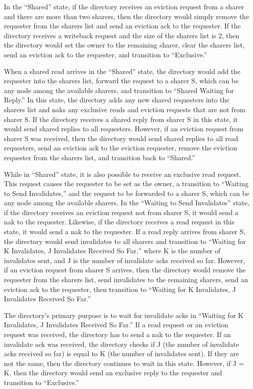 \documentclass[letterpaper]{article}
\begin{document}
In the ``Shared'' state, if the directory receives an eviction request from a sharer and there are more than two sharers, then the directory would simply remove the requester from the sharers list and send an eviction ack to the requester. If the directory receives a writeback request and the size of the sharers list is 2, then the directory would set the owner to the remaining sharer, clear the sharers list, send an eviction ack to the requester, and transition to ``Exclusive.''

When a shared read arrives in the ``Shared'' state, the directory would add the requester into the sharers list, forward the request to a sharer S, which can be any node among the available sharers, and transition to ``Shared Waiting for Reply.'' In this state, the directory adds any new shared requesters into the sharers list and naks any exclusive reads and eviction requests that are not from sharer S. If the directory receives a shared reply from sharer S in this state, it would send shared replies to all requesters. However, if an eviction request from sharer S was received, then the directory would send shared replies to all read requesters, send an eviction ack to the eviction requester, remove the eviction requester from the sharers list, and transition back to ``Shared.''

While in ``Shared'' state, it is also possible to receive an exclusive read request. This request causes the requester to be set as the owner, a transition to ``Waiting to Send Invalidates,'' and the request to be forwarded to a sharer S, which can be any node among the available sharers. In the ``Waiting to Send Invalidates'' state, if the directory receives an eviction request not from sharer S, it would send a nak to the requester. Likewise, if the directory receives a read request in this state, it would send a nak to the requester. If a read reply arrives from sharer S, the directory would send invalidates to all sharers and transition to ``Waiting for K Invalidates, J Invalidates Received So Far,'' where K is the number of invalidates sent, and J is the number of invalidate acks received so far. However, if an eviction request from sharer S arrives, then the directory would remove the requester from the sharers list, send invalidates to the remaining sharers, send an eviction ack to the requester, then transition to ``Waiting for K Invalidates, J Invalidates Received So Far.''

The directory's primary purpose is to wait for invalidate acks in ``Waiting for K Invalidates, J Invalidates Received So Far.'' If a read request or an eviction request was received, the directory has to send a nak to the requester. If an invalidate ack was received, the directory checks if J (the number of invalidate acks received so far) is equal to K (the number of invalidates sent). If they are not the same, then the directory continues to wait in this state. However, if J = K, then the directory would send an exclusive reply to the requester and transition to ``Exclusive.''
\end{document}
